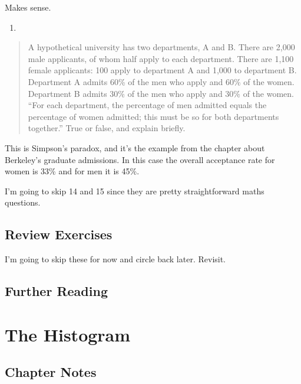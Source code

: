 \documentclass[
]{book}
\providecommand{\tightlist}{%
  \setlength{\itemsep}{0pt}\setlength{\parskip}{0pt}}
\begin{document}
Makes sense.

\begin{enumerate}
\def\labelenumi{\arabic{enumi}.}
\setcounter{enumi}{12}
\tightlist
\item
\end{enumerate}

\begin{quote}
A hypothetical university has two departments, A and B. There are 2,000 male applicants, of whom half apply to each department. There are 1,100 female applicants: 100 apply to department A and 1,000 to department B. Department A admits 60\% of the men who apply and 60\% of the women. Department B admits 30\% of the men who apply and 30\% of the women. ``For each department, the percentage of men admitted equals the percentage of women admitted; this must be so for both departments together.'' True or false, and explain briefly.
\end{quote}

This is Simpson's paradox, and it's the example from the chapter about Berkeley's graduate admissions. In this case the overall acceptance rate for women is 33\% and for men it is 45\%.

I'm going to skip 14 and 15 since they are pretty straightforward maths questions.

\hypertarget{review-exercises}{%
\section{Review Exercises}\label{review-exercises}}

I'm going to skip these for now and circle back later. Revisit.

\hypertarget{further-reading-1}{%
\section*{Further Reading}\label{further-reading-1}}

\hypertarget{histogram}{%
\chapter{The Histogram}\label{histogram}}

\hypertarget{chapter-notes-2}{%
\section{Chapter Notes}\label{chapter-notes-2}}
\end{document}

